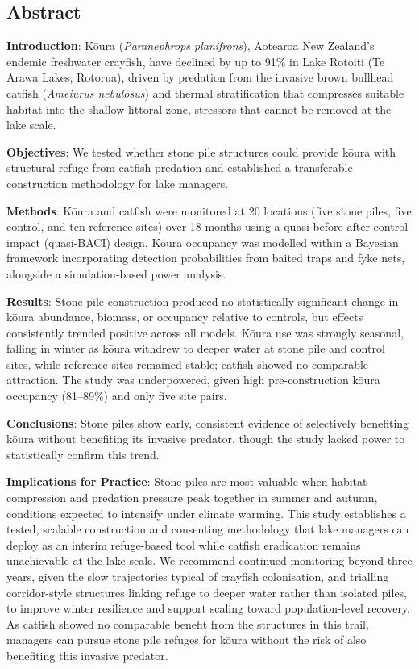 \documentclass[
  letterpaper,
  DIV=11,
  numbers=noendperiod]{scrartcl}
\begin{document}
\subsection*{Abstract}\label{abstract}

\textbf{Introduction}: Kōura (\emph{Paranephrops planifrons}), Aotearoa
New Zealand's endemic freshwater crayfish, have declined by up to 91\%
in Lake Rotoiti (Te Arawa Lakes, Rotorua), driven by predation from the
invasive brown bullhead catfish (\emph{Ameiurus nebulosus}) and thermal
stratification that compresses suitable habitat into the shallow
littoral zone, stressors that cannot be removed at the lake scale.

\textbf{Objectives}: We tested whether stone pile structures could
provide kōura with structural refuge from catfish predation and
established a transferable construction methodology for lake managers.

\textbf{Methods}: Kōura and catfish were monitored at 20 locations (five
stone piles, five control, and ten reference sites) over 18 months using
a quasi before-after control-impact (quasi-BACI) design. Kōura occupancy
was modelled within a Bayesian framework incorporating detection
probabilities from baited traps and fyke nets, alongside a
simulation-based power analysis.

\textbf{Results}: Stone pile construction produced no statistically
significant change in kōura abundance, biomass, or occupancy relative to
controls, but effects consistently trended positive across all models.
Kōura use was strongly seasonal, falling in winter as kōura withdrew to
deeper water at stone pile and control sites, while reference sites
remained stable; catfish showed no comparable attraction. The study was
underpowered, given high pre-construction kōura occupancy (81--89\%) and
only five site pairs.

\textbf{Conclusions}: Stone piles show early, consistent evidence of
selectively benefiting kōura without benefiting its invasive predator,
though the study lacked power to statistically confirm this trend.

\textbf{Implications for Practice}: Stone piles are most valuable when
habitat compression and predation pressure peak together in summer and
autumn, conditions expected to intensify under climate warming. This
study establishes a tested, scalable construction and consenting
methodology that lake managers can deploy as an interim refuge-based
tool while catfish eradication remains unachievable at the lake scale.
We recommend continued monitoring beyond three years, given the slow
trajectories typical of crayfish colonisation, and trialling
corridor-style structures linking refuge to deeper water rather than
isolated piles, to improve winter resilience and support scaling toward
population-level recovery. As catfish showed no comparable benefit from
the structures in this trail, managers can pursue stone pile refuges for
kōura without the risk of also benefiting this invasive predator.
\end{document}
